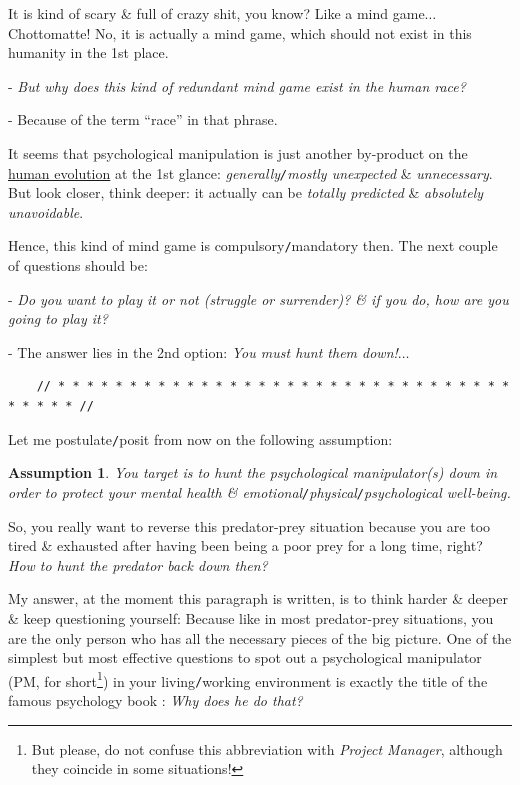 \documentclass[12pt]{article}
\newtheorem{assumption}{Assumption}
\begin{document}
\noindent
{} It is kind of scary \& full of crazy shit, you know? Like a mind game$\ldots$ Chottomatte! No, it is actually a mind game, which should not exist in this humanity in the 1st place.

- {\it But why does this kind of redundant mind game exist in the human race?}

- Because of the term ``race'' in that phrase.

It seems that psychological manipulation is just another by-product on the \href{https://en.wikipedia.org/wiki/Human_evolution}{human evolution} at the 1st glance: {\it generally{\tt/}mostly unexpected} \& {\it unnecessary}. But look closer, think deeper: it actually can be {\it totally predicted} \& {\it absolutely unavoidable}.

Hence, this kind of mind game is compulsory{\tt/}mandatory then. The next couple of questions should be:

- {\it Do you want to play it or not (struggle or surrender)? \& if you do, how are you going to play it?}

- The answer lies in the 2nd option: {\it You must hunt them down!$\ldots$}

\begin{verbatim}
	// * * * * * * * * * * * * * * * * * * * * * * * * * * * * * * * * * * * * * //
\end{verbatim}

\noindent
{} Let me postulate{\tt/}posit from now on the following assumption:

\begin{assumption}
	You target is to hunt the psychological manipulator(s) down in order to protect your mental health \& emotional{\tt/}physical{\tt/}psychological well-being.
\end{assumption}
So, you really want to reverse this predator-prey situation because you are too tired \& exhausted after having been being a poor prey for a long time, right? {\it How to hunt the predator back down then?}

My answer, at the moment this paragraph is written, is to think harder \& deeper \& keep questioning yourself: Because like in most predator-prey situations, you are the only person who has all the necessary pieces of the big picture. One of the simplest but most effective questions to spot out a psychological manipulator (PM, for short\footnote{But please, do not confuse this abbreviation with {\it Project Manager}, although they coincide in some situations!}) in your living{\tt/}working environment is exactly the title of the famous psychology book \cite{Bancroft_why_he_do,Bancroft_why_he_do_VN}: {\it Why does he do that?}
\end{document}
